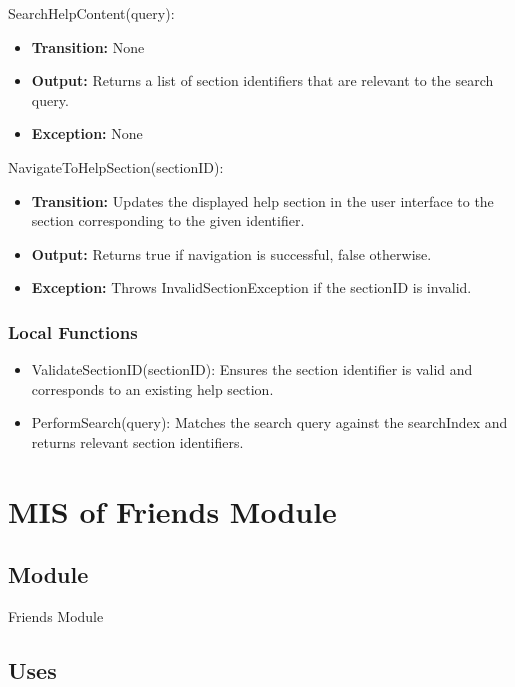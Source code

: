 \documentclass[12pt, titlepage]{article}
\begin{document}
\noindent SearchHelpContent(query):
\begin{itemize}
  \item \textbf{Transition:} None
  \item \textbf{Output:} Returns a list of section identifiers that are relevant to the search query.
  \item \textbf{Exception:} None
\end{itemize}

\noindent NavigateToHelpSection(sectionID):
\begin{itemize}
  \item \textbf{Transition:} Updates the displayed help section in the user interface to the section corresponding to the given identifier.
  \item \textbf{Output:} Returns true if navigation is successful, false otherwise.
  \item \textbf{Exception:} Throws InvalidSectionException if the sectionID is invalid.
\end{itemize}

\subsubsection{Local Functions}

\begin{itemize}
  \item ValidateSectionID(sectionID): Ensures the section identifier is valid and corresponds to an existing help section.
  \item PerformSearch(query): Matches the search query against the searchIndex and returns relevant section identifiers.
\end{itemize}


\newpage

\section{MIS of Friends Module} \label{Module_Friends}

\subsection{Module}

Friends Module

\subsection{Uses}
\end{document}
